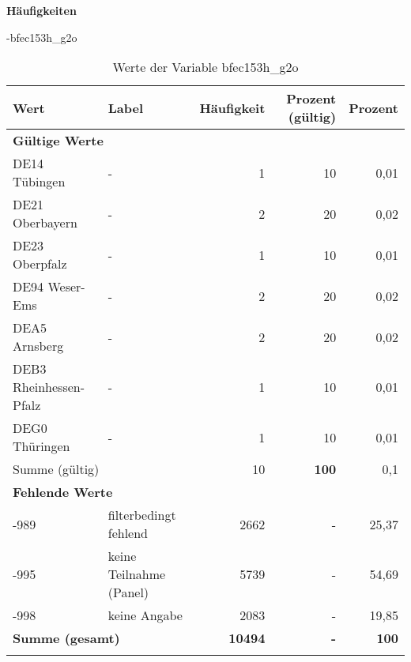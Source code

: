         		\vspace*{0.5cm}
                \noindent\textbf{Häufigkeiten}

                \vspace*{-\baselineskip}
					\begin{filecontents}{\jobname-bfec153h_g2o}
					\begin{longtable}{Xlrrr}
					\toprule
					\textbf{Wert} & \textbf{Label} & \textbf{Häufigkeit} & \textbf{Prozent (gültig)} & \textbf{Prozent} \\
					\endhead
					\midrule
					\multicolumn{5}{l}{\textbf{Gültige Werte}}\\

					\multicolumn{1}{X}{DE14 Tübingen} &
					- &
					1 &
					10 &
					0,01 \\
					
					\multicolumn{1}{X}{DE21 Oberbayern} &
					- &
					2 &
					20 &
					0,02 \\
					
					\multicolumn{1}{X}{DE23 Oberpfalz} &
					- &
					1 &
					10 &
					0,01 \\
					
					\multicolumn{1}{X}{DE94 Weser-Ems} &
					- &
					2 &
					20 &
					0,02 \\
					
					\multicolumn{1}{X}{DEA5 Arnsberg} &
					- &
					2 &
					20 &
					0,02 \\
					
					\multicolumn{1}{X}{DEB3 Rheinhessen-Pfalz} &
					- &
					1 &
					10 &
					0,01 \\
					
					\multicolumn{1}{X}{DEG0 Thüringen} &
					- &
					1 &
					10 &
					0,01 \\
					\midrule
						\multicolumn{2}{l}{Summe (gültig)} & 10 &
						\textbf{100} &
					    0,1 \\
					\multicolumn{5}{l}{\textbf{Fehlende Werte}}\\
							-989 & filterbedingt fehlend & 2662 & - & 25,37 \\

							-995 & keine Teilnahme (Panel) & 5739 & - & 54,69 \\

							-998 & keine Angabe & 2083 & - & 19,85 \\

					\midrule
					\multicolumn{2}{l}{\textbf{Summe (gesamt)}} & \textbf{10494} & \textbf{-} & \textbf{100} \\
					\bottomrule
					\caption{Werte der Variable bfec153h\_g2o}
					\end{longtable}
					\end{filecontents}


